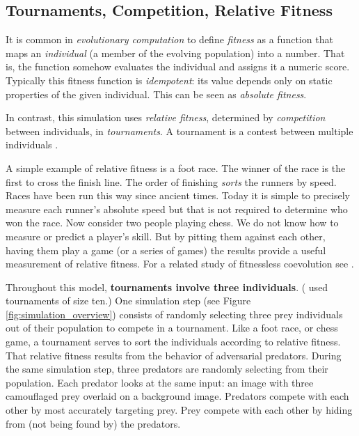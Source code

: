\documentclass[letterpaper]{article}
\newcommand{\jargon}[1]{\textit{#1}}
\begin{document}
\subsection{Tournaments, Competition, Relative Fitness}
\label{subsec:tournaments}
It is common in \jargon{evolutionary computation} to define \jargon{fitness} as a function that maps an \jargon{individual} (a member of the evolving population) into a number. That is, the function somehow evaluates the individual and assigns it a numeric score. Typically this fitness function is \jargon{idempotent}: its value depends only on static properties of the given individual. This can be seen as \jargon{absolute fitness}.
\par
In contrast, this simulation uses \jargon{relative fitness}, determined by \jargon{competition} between individuals, in \jargon{tournaments}. A tournament is a contest between multiple individuals \citep{angeline_competitive_1993}.
\par
A simple example of relative fitness is a foot race. The winner of the race is the first to cross the finish line. The order of finishing \jargon{sorts} the runners by speed. Races have been run this way since ancient times. Today it is simple to precisely measure each runner's absolute speed but that is not required to determine who won the race. Now consider two people playing chess. We do not know how to measure or predict a player's skill. But by pitting them against each other, having them play a game (or a series of games) the results provide a useful measurement of relative fitness. For a related study of fitnessless coevolution see \citet{jaskowski_fitnessless_2008}.
\par
Throughout this model, \textbf{tournaments involve three individuals}. (\citet{reynolds_iec_2011} used tournaments of size ten.) One simulation step (see Figure \ref{fig:simulation_overview}) consists of randomly selecting three prey individuals out of their population to compete in a tournament. Like a foot race, or chess game, a tournament serves to sort the individuals according to relative fitness. That relative fitness results from the behavior of adversarial predators. During the same simulation step, three predators are randomly selecting from their population. Each predator looks at the same input: an image with three camouflaged prey overlaid on a background image. Predators compete with each other by most accurately targeting prey. Prey compete with each other by hiding from (not being found by) the predators.
\par
\end{document}

